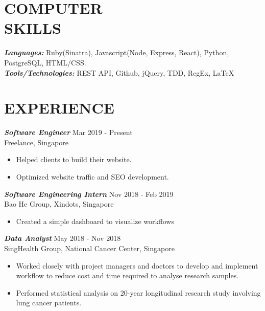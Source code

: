 \documentclass[margin, 11pt]{res} %
\begin{document}
\begin{resume}

\section{COMPUTER \\ SKILLS} 

{\sl \textbf{Languages:}} 
Ruby(Sinatra), Javascript(Node, Express, React), Python, \\PostgreSQL, HTML/CSS. \\
{\sl \textbf{Tools/Technologies:}}
REST API, Github, jQuery, TDD, RegEx, LaTeX
 
 
\section{EXPERIENCE}


{\sl \textbf{Software Engineer}} \hfill Mar 2019 - Present \\
Freelance, Singapore

\begin{itemize} \itemsep -2pt %
\item Helped clients to build their website.
\item Optimized website traffic and SEO development.
\end{itemize}
 
{\sl \textbf{Software Engineering Intern}} \hfill Nov 2018 - Feb 2019 \\
Bao He Group, Xindots, Singapore
\begin{itemize} 
\item Created a simple dashboard to visualize workflows
\end{itemize} 

{\sl \textbf{Data Analyst}} \hfill May 2018 - Nov 2018 \\
SingHealth Group, National Cancer Center, Singapore
\begin{itemize}
\item Worked closely with project managers and doctors to develop and implement workflow to reduce cost and time required to analyse research samples.
\item Performed statistical analysis on 20-year longitudinal research study involving lung cancer patients.
\end{itemize}


\end{resume}
\end{document}
